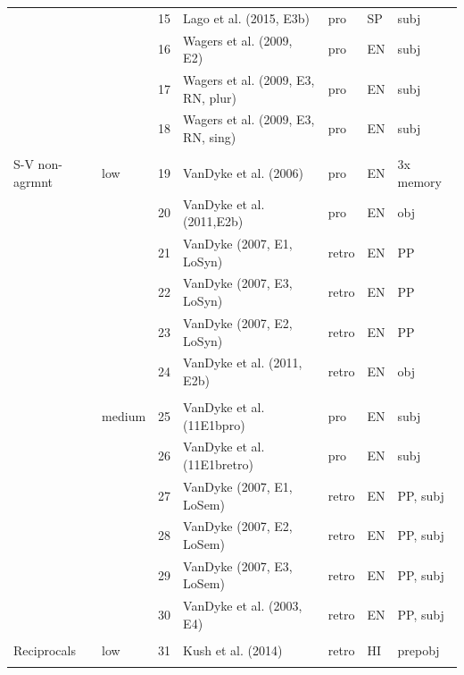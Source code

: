 \documentclass{cambridge7A}\usepackage[]{graphicx}\usepackage[]{color}
\begin{document}
\begin{subappendices}
\begin{table}[!htbp]
{\begin{tabular}{llrllll}
               &            & 15    & Lago et al. (2015, E3b)             & pro     & SP   & subj \\
               &            & 16    & Wagers et al. (2009, E2)            & pro     & EN   & subj \\
               &            & 17    & Wagers et al. (2009, E3, RN, plur)  & pro     & EN   & subj \\
               &            & 18    & Wagers et al. (2009, E3, RN, sing)  & pro     & EN   & subj \\
&&&&&& \\
S-V non-agrmnt & low      & 19    & VanDyke et al. (2006)               & pro     & EN   & 3x memory \\
               &            & 20    & VanDyke et al. (2011,E2b)           & pro     & EN   & obj \\
               &            & 21    & VanDyke (2007, E1, LoSyn)           & retro   & EN   & PP \\
               &            & 22    & VanDyke (2007, E3, LoSyn)           & retro   & EN   & PP \\
               &            & 23    & VanDyke (2007, E2, LoSyn)           & retro   & EN   & PP \\
               &            & 24    & VanDyke et al. (2011, E2b)          & retro   & EN   & obj \\
&&&&&& \\
               & medium         & 25    & VanDyke et al. (11E1bpro)           & pro     & EN   & subj \\
               &            & 26    & VanDyke et al. (11E1bretro)         & pro     & EN   & subj \\
               &            & 27    & VanDyke (2007, E1, LoSem)           & retro   & EN   & PP, subj \\
               &            & 28    & VanDyke (2007, E2, LoSem)           & retro   & EN   & PP, subj \\
               &            & 29    & VanDyke (2007, E3, LoSem)           & retro   & EN   & PP, subj \\
               &            & 30    & VanDyke et al. (2003, E4)           & retro   & EN   & PP, subj \\
&&&&&& \\
Reciprocals    & low      & 31    & Kush et al. (2014)                  & retro   & HI   & prepobj \\
&&&&&& \\

\end{tabular}}
\end{table}
\end{subappendices}
\end{document}
